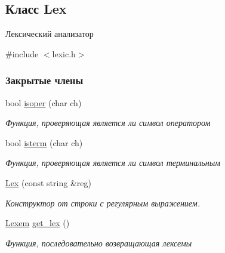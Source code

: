 \hypertarget{class_lex}{}\subsection{Класс Lex}
\label{class_lex}


Лексический анализатор  




{\ttfamily \#include $<$lexic.\+h$>$}

\subsubsection*{Закрытые члены}
\begin{DoxyCompactItemize}
\item 
bool \hyperlink{class_lex_a3b9276570c7b49bb53f646419fdc1cbf}{isoper} (char ch)
\begin{DoxyCompactList}\small\item\em Функция, проверяющая является ли символ оператором \end{DoxyCompactList}\item 
bool \hyperlink{class_lex_a8649a6722fbdc0eb2b331901e959e2d6}{isterm} (char ch)
\begin{DoxyCompactList}\small\item\em Функция, проверяющая является ли символ терминальным \end{DoxyCompactList}\item 
\hyperlink{class_lex_a2d9cafe03428afbced68bb4581357114}{Lex} (const string \&reg)
\begin{DoxyCompactList}\small\item\em Конструктор от строки с регулярным выражением. \end{DoxyCompactList}\item 
\hyperlink{class_lexem}{Lexem} \hyperlink{class_lex_a38b6e95d1a98fd656ee932d34018a0aa}{get\+\_\+lex} ()
\begin{DoxyCompactList}\small\item\em Функция, последовательно возвращающая лексемы \end{DoxyCompactList}\end{DoxyCompactItemize}

